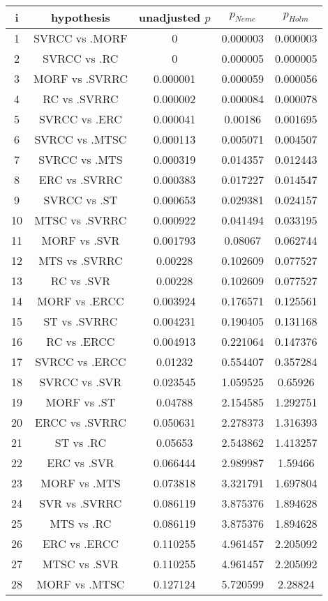 \documentclass[a4paper,10pt]{article}
\begin{document}
\begin{landscape}
\begin{table}[!htp]
\centering\scriptsize
\begin{tabular}{ccccc}
i&hypothesis&unadjusted $p$&$p_{Neme}$&$p_{Holm}$\\
\hline1&SVRCC vs .MORF&0&0.000003&0.000003\\
2&SVRCC vs .RC&0&0.000005&0.000005\\
3&MORF vs .SVRRC&0.000001&0.000059&0.000056\\
4&RC vs .SVRRC&0.000002&0.000084&0.000078\\
5&SVRCC vs .ERC&0.000041&0.00186&0.001695\\
6&SVRCC vs .MTSC&0.000113&0.005071&0.004507\\
7&SVRCC vs .MTS&0.000319&0.014357&0.012443\\
8&ERC vs .SVRRC&0.000383&0.017227&0.014547\\
9&SVRCC vs .ST&0.000653&0.029381&0.024157\\
10&MTSC vs .SVRRC&0.000922&0.041494&0.033195\\
11&MORF vs .SVR&0.001793&0.08067&0.062744\\
12&MTS vs .SVRRC&0.00228&0.102609&0.077527\\
13&RC vs .SVR&0.00228&0.102609&0.077527\\
14&MORF vs .ERCC&0.003924&0.176571&0.125561\\
15&ST vs .SVRRC&0.004231&0.190405&0.131168\\
16&RC vs .ERCC&0.004913&0.221064&0.147376\\
17&SVRCC vs .ERCC&0.01232&0.554407&0.357284\\
18&SVRCC vs .SVR&0.023545&1.059525&0.65926\\
19&MORF vs .ST&0.04788&2.154585&1.292751\\
20&ERCC vs .SVRRC&0.050631&2.278373&1.316393\\
21&ST vs .RC&0.05653&2.543862&1.413257\\
22&ERC vs .SVR&0.066444&2.989987&1.59466\\
23&MORF vs .MTS&0.073818&3.321791&1.697804\\
24&SVR vs .SVRRC&0.086119&3.875376&1.894628\\
25&MTS vs .RC&0.086119&3.875376&1.894628\\
26&ERC vs .ERCC&0.110255&4.961457&2.205092\\
27&MTSC vs .SVR&0.110255&4.961457&2.205092\\
28&MORF vs .MTSC&0.127124&5.720599&2.28824\\

\end{tabular}
\end{table}
\end{landscape}
\end{document}
